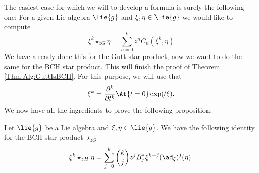 The easiest case for which we will to develop a formula is surely the 
following one: For a given Lie algebra $\lie{g}$ and $\xi, \eta \in 
\lie{g}$ we would like to compute
\begin{equation*}
    \xi^k \star_{zG} \eta
    =
    \sum\limits_{n=0}^k
    z^n C_n(\xi^k, \eta)
\end{equation*}
We have already done this for the Gutt star product, now we 
want to do the same for the BCH star product. This will finish
the proof of Theorem \ref{Thm:Alg:GuttIsBCH}. For this purpose, 
we will use that
\begin{equation}\label{Formulas:MonomialDerivative}
    \xi^k
    =
    \frac{\partial^k}{\partial t^k}
    \At{t = 0} \exp(t \xi).
\end{equation}
We now have all the ingredients to prove the following proposition:
\begin{lemma}
    \label{Lemma:Formulas:LinearMonomial1}
    Let $\lie{g}$ be a Lie algebra and $\xi, \eta \in \lie{g}$. We
    have the following identity for the BCH star product $\star_{zG}$
    \begin{equation}
        \label{Formulas:LinearMonomial1}
        \xi^k \star_{zH} \eta
        =
        \sum\limits_{j=0}^k
        \binom{k}{j} z^j B_j^*
        \xi^{k-j}(\ad_{\xi})^j (\eta).
    \end{equation}
\end{lemma}
